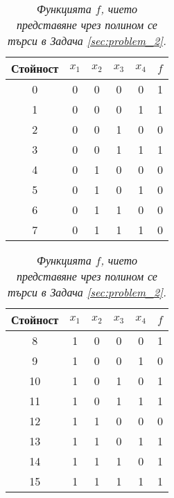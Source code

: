 \documentclass[11pt, oneside]{article}   	%
\begin{document}
\begin{table}[htbp]
    \begin{minipage}[t]{.50\textwidth}
        \begin{tabular}{cccccc}
            \toprule
                \textbf{Стойност} &\textbf{$x_1$} & \textbf{$x_2$} & \textbf{$x_3$} & \textbf{$x_4$} & \textbf{$f$} \\
            \midrule
                 0 & 0 & 0 & 0 & 0 & 1 \\
                 1 & 0 & 0 & 0 & 1 & 1 \\
                 2 & 0 & 0 & 1 & 0 & 0 \\
                 3 & 0 & 0 & 1 & 1 & 1 \\
                 4 & 0 & 1 & 0 & 0 & 0 \\
                 5 & 0 & 1 & 0 & 1 & 0 \\
                 6 & 0 & 1 & 1 & 0 & 0 \\
                 7 & 0 & 1 & 1 & 1 & 0 \\
            \bottomrule
        \end{tabular}
    \end{minipage} \hfill
    \begin{minipage}[t]{.50\textwidth}
        \begin{tabular}{cccccc}
            \toprule
                \textbf{Стойност} &\textbf{$x_1$} & \textbf{$x_2$} & \textbf{$x_3$} & \textbf{$x_4$} & \textbf{$f$} \\
            \midrule
                 8 & 1 & 0 & 0 & 0 & 1 \\
                 9 & 1 & 0 & 0 & 1 & 0 \\
                10 & 1 & 0 & 1 & 0 & 1 \\
                11 & 1 & 0 & 1 & 1 & 1 \\
                12 & 1 & 1 & 0 & 0 & 0 \\
                13 & 1 & 1 & 0 & 1 & 1 \\
                14 & 1 & 1 & 1 & 0 & 1 \\
                15 & 1 & 1 & 1 & 1 & 1 \\
            \bottomrule
        \end{tabular}
    \end{minipage} \hfill
    \caption{\textit{Функцията $f$, чието представяне чрез полином се търси в Задача \ref{sec:problem_2}.}}
    \label{tab:problem_2_truth_table}
\end{table}
\end{document}
